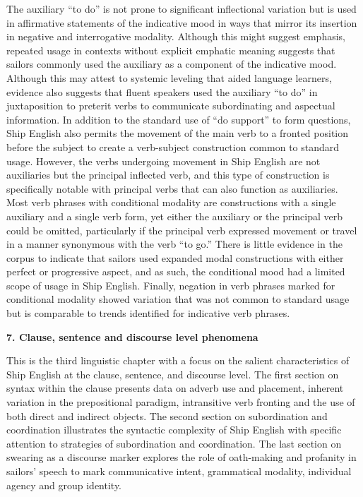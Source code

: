 \begin{styleStandard}
The auxiliary “to do” is not prone to significant inflectional variation but is used in affirmative statements of the indicative mood in ways that mirror its insertion in negative and interrogative modality. Although this might suggest emphasis, repeated usage in contexts without explicit emphatic meaning suggests that sailors commonly used the auxiliary as a component of the indicative mood. Although this may attest to systemic leveling that aided language learners, evidence also suggests that fluent speakers used the auxiliary “to do” in juxtaposition to preterit verbs to communicate subordinating and aspectual information. In addition to the standard use of “do support” to form questions, Ship English also permits the movement of the main verb to a fronted position before the subject to create a verb-subject construction common to standard usage. However, the verbs undergoing movement in Ship English are not auxiliaries but the principal inflected verb, and this type of construction is specifically notable with principal verbs that can also function as auxiliaries. Most verb phrases with conditional modality are constructions with a single auxiliary and a single verb form, yet either the auxiliary or the principal verb could be omitted, particularly if the principal verb expressed movement or travel in a manner synonymous with the verb “to go.” There is little evidence in the corpus to indicate that sailors used expanded modal constructions with either perfect or progressive aspect, and as such, the conditional mood had a limited scope of usage in Ship English. Finally, negation in verb phrases marked for conditional modality showed variation that was not common to standard usage but is comparable to trends identified for indicative verb phrases. 
\end{styleStandard}

\clearpage\begin{styleStandard}
\textbf{7. Clause, sentence and discourse level phenomena}
\end{styleStandard}

\begin{styleStandard}
This is the third linguistic chapter with a focus on the salient characteristics of Ship English at the clause, sentence, and discourse level. The first section on syntax within the clause presents data on adverb use and placement, inherent variation in the prepositional paradigm, intransitive verb fronting and the use of both direct and indirect objects. The second section on subordination and coordination illustrates the syntactic complexity of Ship English with specific attention to strategies of subordination and coordination. The last section on swearing as a discourse marker explores the role of oath-making and profanity in sailors’ speech to mark communicative intent, grammatical modality, individual agency and group identity. 
\end{styleStandard}

